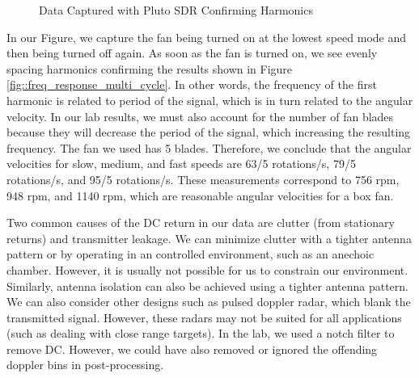 \documentclass{article}
\begin{document}
\begin{figure}[H]
    	\centering
    	\caption{Data Captured with Pluto SDR Confirming Harmonics}
    	\label{fig::dopp_harmonics}
\end{figure}

\noindent In our Figure, we capture the fan being turned on at the lowest speed mode and then being turned off again. As soon as the fan is turned on, we see evenly spacing harmonics confirming the results shown in Figure \ref{fig::freq_response_multi_cycle}. In other words, the frequency of the first harmonic is related to period of the signal, which is in turn related to the angular velocity. In our lab results, we must also account for the number of fan blades because they will decrease the period of the signal, which increasing the resulting frequency. The fan we used has 5 blades. Therefore, we conclude that the angular velocities for slow, medium, and fast speeds are 63/5 rotations/s, 79/5 rotations/s, and 95/5 rotations/s. These measurements correspond to 756 rpm, 948 rpm, and 1140 rpm, which are reasonable angular velocities for a box fan.

Two common causes of the DC return in our data are clutter (from stationary returns) and transmitter leakage. We can minimize clutter with a tighter antenna pattern or by operating in an controlled environment, such as an anechoic chamber. However, it is usually not possible for us to constrain our environment. Similarly, antenna isolation can also be achieved using a tighter antenna pattern. We can also consider other designs such as pulsed doppler radar, which blank the transmitted signal. However, these radars may not be suited for all applications (such as dealing with close range targets). In the lab, we used a notch filter to remove DC. However, we could have also removed or ignored the offending doppler bins in post-processing.
\end{document}

